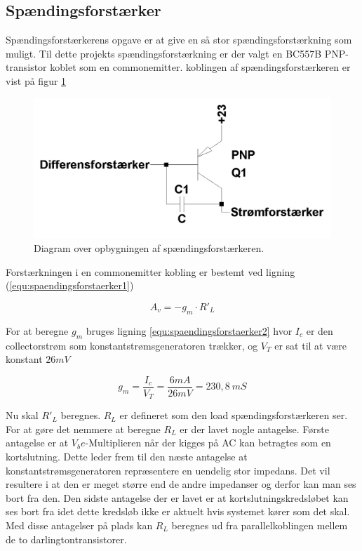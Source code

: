 \subsection{Spændingsforstærker}
\label{effekt_spaendingsforstaerker}
Spændingsforstærkerens opgave er at give en så stor spændingsforstærkning som muligt. Til dette projekts spændingsforstærkning er der valgt en BC557B PNP-transistor koblet som en commonemitter. koblingen af spændingsforstærkeren er vist på figur \ref{spaendingsforstaerker_diagram}

\begin{figure}[h]
\centering
\includegraphics[scale=0.2]{teknisk/effektforstaerker/spaendingsforstaerker_diagram.png}
\caption{Diagram over opbygningen af spændingsforstærkeren.}
\label{spaendingsforstaerker_diagram}
\end{figure}

Forstærkningen i en commonemitter kobling er bestemt ved ligning (\ref{equ:spaendingsforstaerker1}) 

\begin{equation}
\label{equ:spaendingsforstaerker1}
A_v = -g_m \cdot R'_L
\end{equation}

For at beregne $g_m$ bruges ligning \ref{equ:spaendingsforstaerker2} hvor $I_c$ er den collectorstrøm som konstantstrømsgeneratoren trækker, og $V_T$ er sat til at være konstant $26 mV$

\begin{equation}
\label{equ:spaendingsforstaerker2}
g_m = \frac{I_c}{V_T} = \frac{6 mA}{26 mV} = 230,8~mS
\end{equation}

Nu skal $R'_L$ beregnes. $R_L$ er defineret som den load spændingsforstærkeren ser. For at gøre det nemmere at beregne $R_L$ er der lavet nogle antagelse. Første antagelse er at $V_be$-Multiplieren når der kigges på AC kan betragtes som en kortslutning. Dette leder frem til den næste antagelse at konstantstrømsgeneratoren repræsentere en uendelig stor impedans. Det vil resultere i at den er meget større end de andre impedanser og derfor kan man ses bort fra den. Den sidste antagelse der er lavet er at kortslutningskredsløbet kan ses bort fra idet dette kredsløb ikke er aktuelt hvis systemet  kører som det skal. Med disse antagelser på plads kan $R_L$ beregnes ud fra parallelkoblingen mellem de to darlingtontransistorer.



